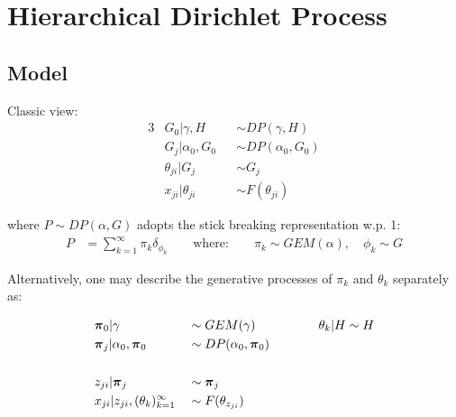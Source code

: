 \documentclass{article} %
\begin{document}
\appendix
\section{Hierarchical Dirichlet Process}

\subsection{Model}

Classic view:
\begin{alignat*}{3}
& G_0 | \gamma, H && \sim DP(\gamma, H) \\
& G_j | \alpha_0, G_0 && \sim DP(\alpha_0, G_0) \\
& \theta_{ji} | G_j && \sim G_j \\
& x_{ji} | \theta_{ji} && \sim F(\theta_{ji})
\end{alignat*}

where $P \sim DP(\alpha, G)$ adopts the stick breaking representation w.p. 1:
\begin{align*}
P &= \sum_{k=1}^\infty \pi_k \delta_{\phi_k} \qquad \mbox{where:} 
\qquad
\pi_k \sim GEM(\alpha), \quad \phi_k  \sim G
\end{align*}

Alternatively, one may describe the generative processes of $\pi_k$ and $\theta_k$ separately as:

\begin{alignat*}{3}
& \boldsymbol{\pi}_0 | \gamma && \sim GEM(\gamma) 
\qquad\qquad && \theta_k | H \sim H 
\\
& \boldsymbol{\pi}_j | \alpha_0, \boldsymbol{\pi}_0 && \sim DP(\alpha_0, \boldsymbol{\pi}_0) \\ \\
& z_{ji} | \boldsymbol{\pi}_j && \sim \boldsymbol{\pi}_j \\
& 
x_{ji} | z_{ji}, (\theta_{k})_{k=1}^\infty && \sim F(\theta_{z_{ji}})
\end{alignat*}
\end{document}
